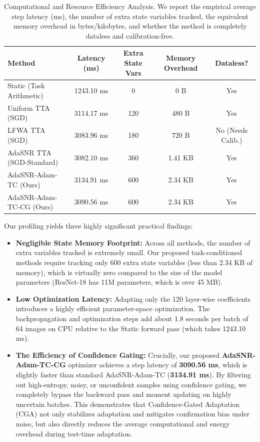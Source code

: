 \documentclass{article}
\theoremstyle{plain}
\theoremstyle{definition}
\theoremstyle{remark}
\begin{document}
\begin{table}[t]
\caption{Computational and Resource Efficiency Analysis. We report the empirical average step latency (ms), the number of extra state variables tracked, the equivalent memory overhead in bytes/kilobytes, and whether the method is completely dataless and calibration-free.}
\label{tab:efficiency_analysis}
\vskip 0.15in
\begin{center}
\begin{small}
\begin{tabular}{lcccc}
\toprule
\textbf{Method} & \textbf{Latency (ms)} & \textbf{Extra State Vars} & \textbf{Memory Overhead} & \textbf{Dataless?} \\
\midrule
Static (Task Arithmetic)   & 1243.10 ms & 0 & 0 B & Yes \\
Uniform TTA (SGD)          & 3114.17 ms & 120 & 480 B & Yes \\
LFWA TTA (SGD)             & 3083.96 ms & 180 & 720 B & No (Needs Calib.) \\
AdaSNR TTA (SGD-Standard)  & 3082.10 ms & 360 & 1.41 KB & Yes \\
AdaSNR-Adam-TC (Ours)      & 3134.91 ms & 600 & 2.34 KB & Yes \\
AdaSNR-Adam-TC-CG (Ours)   & 3090.56 ms & 600 & 2.34 KB & Yes \\
\bottomrule
\end{tabular}
\end{small}
\end{center}
\vskip -0.1in
\end{table}

Our profiling yields three highly significant practical findings:
\begin{itemize}
    \item \textbf{Negligible State Memory Footprint:} Across all methods, the number of extra variables tracked is extremely small. Our proposed task-conditioned methods require tracking only 600 extra state variables (less than 2.34 KB of memory), which is virtually zero compared to the size of the model parameters (ResNet-18 has 11M parameters, which is over 45 MB).
    \item \textbf{Low Optimization Latency:} Adapting only the 120 layer-wise coefficients introduces a highly efficient parameter-space optimization. The backpropagation and optimization steps add about 1.8 seconds per batch of 64 images on CPU relative to the Static forward pass (which takes 1243.10 ms).
    \item \textbf{The Efficiency of Confidence Gating:} Crucially, our proposed \textbf{AdaSNR-Adam-TC-CG} optimizer achieves a step latency of \textbf{3090.56 ms}, which is slightly faster than standard AdaSNR-Adam-TC (\textbf{3134.91 ms}). By filtering out high-entropy, noisy, or unconfident samples using confidence gating, we completely bypass the backward pass and moment updating on highly uncertain batches. This demonstrates that Confidence-Gated Adaptation (CGA) not only stabilizes adaptation and mitigates confirmation bias under noise, but also directly reduces the average computational and energy overhead during test-time adaptation.
\end{itemize}
\end{document}
